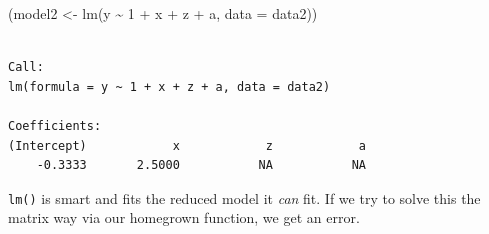 \documentclass[
  letterpaper,
  DIV=11,
  numbers=noendperiod]{scrartcl}
\newenvironment{Shaded}{}{}
\newcommand{\AttributeTok}[1]{\textcolor[rgb]{0.84,0.23,0.29}{#1}}
\newcommand{\DecValTok}[1]{\textcolor[rgb]{0.00,0.36,0.77}{#1}}
\newcommand{\FunctionTok}[1]{\textcolor[rgb]{0.44,0.26,0.76}{#1}}
\newcommand{\NormalTok}[1]{\textcolor[rgb]{0.14,0.16,0.18}{#1}}
\newcommand{\OtherTok}[1]{\textcolor[rgb]{0.44,0.26,0.76}{#1}}
\newcommand{\SpecialCharTok}[1]{\textcolor[rgb]{0.00,0.36,0.77}{#1}}
\begin{document}
\begin{Shaded}
\begin{Highlighting}[]
\NormalTok{(model2 }\OtherTok{\textless{}{-}} \FunctionTok{lm}\NormalTok{(y }\SpecialCharTok{\textasciitilde{}} \DecValTok{1} \SpecialCharTok{+}\NormalTok{ x }\SpecialCharTok{+}\NormalTok{ z }\SpecialCharTok{+}\NormalTok{ a, }\AttributeTok{data =}\NormalTok{ data2))}
\end{Highlighting}
\end{Shaded}

\begin{verbatim}

Call:
lm(formula = y ~ 1 + x + z + a, data = data2)

Coefficients:
(Intercept)            x            z            a  
    -0.3333       2.5000           NA           NA  
\end{verbatim}

\texttt{lm()} is smart and fits the reduced model it \emph{can} fit. If
we try to solve this the matrix way via our homegrown function, we get
an error.
\end{document}
